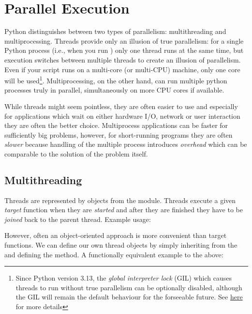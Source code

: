 \newpage
\section{Parallel Execution}
Python distinguishes between two types of parallelism: multithreading and multiprocessing. Threads provide only an illusion of true parallelism: for a single Python process (i.e., when you run ) only one thread runs at the same time, but execution switches between multiple threads to create an illusion of parallelism. Even if your script runs on a multi-core (or multi-CPU) machine, only one core will be used\footnote{Since Python version 3.13, the \emph{global interpreter lock} (GIL) which causes  threads to run without true parallelism can be optionally disabled, although the GIL will remain the default behaviour for the forseeable future. See \href{https://docs.python.org/3.13/whatsnew/3.13.html\#whatsnew313-free-threaded-cpython}{here} for more details}. Multiprocessing, on the other hand, can run multiple python processes truly in parallel, simultaneously on more CPU cores if available.

While threads might seem pointless, they are often easier to use and especially for applications which wait on either hardware I/O, network or user interaction they are often the better choice. Multiprocess applications can be faster for sufficiently big problems, however, for short-running programs they are often \emph{slower} because handling of the multiple process introduces \emph{overhead} which can be comparable to the solution of the problem itself.

\subsection{Multithreading}

Threads are represented by  objects from the  module. Threads execute a given \emph{target} function when they are \emph{started} and after they are finished they have to be \emph{joined} back to the parent thread. Example usage:


However, often an object-oriented approach is more convenient than target functions. We can define our own thread objects by simply inheriting from the  and defining the  method. A functionally equivalent example to the above:


